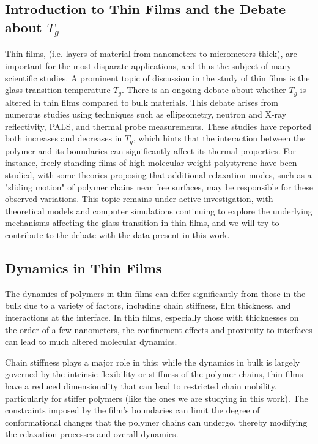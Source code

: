 \subsection{Introduction to Thin Films and the Debate about $T_g$}
Thin films, (i.e. layers of material from nanometers to micrometers thick), are important for the most disparate applications, and thus the subject of many scientific studies. A prominent topic of discussion in the study of thin films is the glass transition temperature \(T_g\). There is an ongoing debate about whether \(T_g\) is altered in thin films compared to bulk materials. This debate arises from numerous studies using techniques such as ellipsometry, neutron and X-ray reflectivity, \ac{PALS}, and thermal probe measurements. These studies have reported both increases and decreases in \(T_g\), which hints that the interaction between the polymer and its boundaries can significantly affect its thermal properties. For instance, freely standing films of high molecular weight polystyrene have been studied, with some theories proposing that additional relaxation modes, such as a "sliding motion" of polymer chains near free surfaces, may be responsible for these observed variations. This topic remains under active investigation, with theoretical models and computer simulations continuing to explore the underlying mechanisms affecting the glass transition in thin films, and we will try to contribute to the debate with the data present in this work. %

\subsection{Dynamics in Thin Films}

The dynamics of polymers in thin films can differ significantly from those in the bulk due to a variety of factors, including chain stiffness, film thickness, and interactions at the interface. In thin films, especially those with thicknesses on the order of a few nanometers, the confinement effects and proximity to interfaces can lead to much altered molecular dynamics.

Chain stiffness plays a major role in this: while the dynamics in bulk is largely governed by the intrinsic flexibility or stiffness of the polymer chains, thin films have a reduced dimensionality that can lead to restricted chain mobility, particularly for stiffer polymers (like the ones we are studying in this work). The constraints imposed by the film's boundaries can limit the degree of conformational changes that the polymer chains can undergo, thereby modifying the relaxation processes and overall dynamics.

